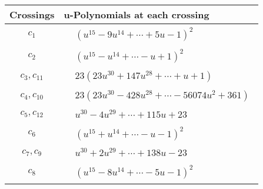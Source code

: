 \documentclass[1p]{elsarticle_modified}
\theoremstyle{definition}
\begin{document}
\begin{tabular}{m{50pt}|m{274pt}}
Crossings & \hspace{64pt}u-Polynomials at each crossing \\
\hline $$\begin{aligned}c_{1}\end{aligned}$$&$\begin{aligned}
&(u^{15}-9 u^{14}+\cdots+5 u-1)^{2}
\end{aligned}$\\
\hline $$\begin{aligned}c_{2}\end{aligned}$$&$\begin{aligned}
&(u^{15}- u^{14}+\cdots- u+1)^{2}
\end{aligned}$\\
\hline $$\begin{aligned}c_{3},c_{11}\end{aligned}$$&$\begin{aligned}
&23(23 u^{30}+147 u^{28}+\cdots+u+1)
\end{aligned}$\\
\hline $$\begin{aligned}c_{4},c_{10}\end{aligned}$$&$\begin{aligned}
&23(23 u^{30}-428 u^{28}+\cdots-56074 u^2+361)
\end{aligned}$\\
\hline $$\begin{aligned}c_{5},c_{12}\end{aligned}$$&$\begin{aligned}
&u^{30}-4 u^{29}+\cdots+115 u+23
\end{aligned}$\\
\hline $$\begin{aligned}c_{6}\end{aligned}$$&$\begin{aligned}
&(u^{15}+u^{14}+\cdots- u-1)^{2}
\end{aligned}$\\
\hline $$\begin{aligned}c_{7},c_{9}\end{aligned}$$&$\begin{aligned}
&u^{30}+2 u^{29}+\cdots+138 u-23
\end{aligned}$\\
\hline $$\begin{aligned}c_{8}\end{aligned}$$&$\begin{aligned}
&(u^{15}-8 u^{14}+\cdots-5 u-1)^{2}
\end{aligned}$\\
\hline
\end{tabular}\\~\\
\end{document}
